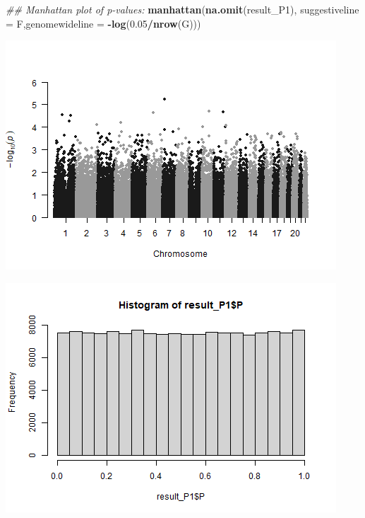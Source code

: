\documentclass[
]{article}
\newenvironment{Shaded}{\begin{snugshade}}{\end{snugshade}}
\newcommand{\CommentTok}[1]{\textcolor[rgb]{0.56,0.35,0.01}{\textit{#1}}}
\newcommand{\DataTypeTok}[1]{\textcolor[rgb]{0.13,0.29,0.53}{#1}}
\newcommand{\DecValTok}[1]{\textcolor[rgb]{0.00,0.00,0.81}{#1}}
\newcommand{\FloatTok}[1]{\textcolor[rgb]{0.00,0.00,0.81}{#1}}
\newcommand{\KeywordTok}[1]{\textcolor[rgb]{0.13,0.29,0.53}{\textbf{#1}}}
\newcommand{\NormalTok}[1]{#1}
\newcommand{\OperatorTok}[1]{\textcolor[rgb]{0.81,0.36,0.00}{\textbf{#1}}}
\begin{document}
\begin{Shaded}
\begin{Highlighting}[]
\CommentTok{## Manhattan plot of p-values:}
\KeywordTok{manhattan}\NormalTok{(}\KeywordTok{na.omit}\NormalTok{(result_P1), }\DataTypeTok{suggestiveline =}\NormalTok{ F,}\DataTypeTok{genomewideline =} \OperatorTok{-}\KeywordTok{log}\NormalTok{(}\FloatTok{0.05}\OperatorTok{/}\KeywordTok{nrow}\NormalTok{(G)))}
\end{Highlighting}
\end{Shaded}

\includegraphics{stats-gene-research-progress-v8_files/figure-latex/unnamed-chunk-3-2.png}

\begin{Shaded}
\end{Shaded}

\includegraphics{stats-gene-research-progress-v8_files/figure-latex/unnamed-chunk-3-3.png}
\end{document}

